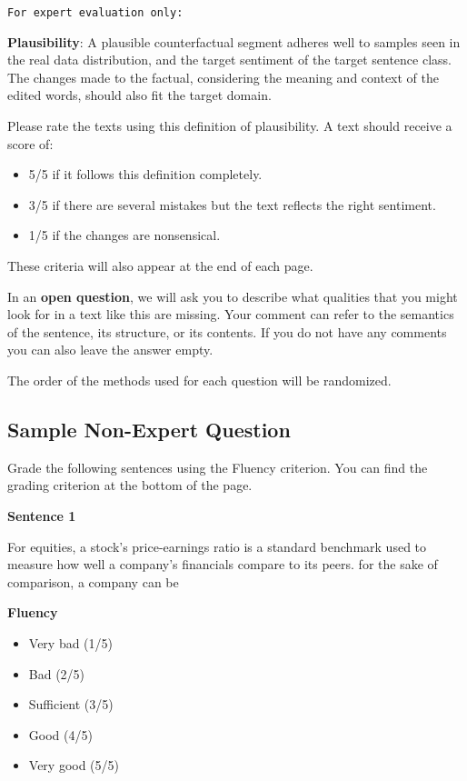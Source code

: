 \documentclass[11pt]{article}
\begin{document}
\verb|For expert evaluation only:|

\textbf{Plausibility}: A plausible counterfactual segment adheres well to samples seen in the real data distribution, and the target sentiment of the target sentence class. The changes made to the factual, considering the meaning and context of the edited words, should also fit the target domain.

Please rate the texts using this definition of plausibility. A text should receive a score of:
\begin{itemize}
    \item 5/5 if it follows this definition completely.
    \item 3/5 if there are several mistakes but the text reflects the right sentiment.
    \item 1/5 if the changes are nonsensical.
\end{itemize}

These criteria will also appear at the end of each page.

In an \textbf{open question}, we will ask you to describe what qualities that you might look for in a text like this are missing. Your comment can refer to the semantics of the sentence, its structure, or its contents. If you do not have any comments you can also leave the answer empty.

The order of the methods used for each question will be randomized.

\subsection{Sample Non-Expert Question}

Grade the following sentences using the Fluency criterion. You can find the grading criterion at the bottom of the page.

\textbf{Sentence 1}

For equities, a stock's price-earnings ratio is a standard benchmark used to measure how well a company's financials compare to its peers. for the sake of comparison, a company can be

\textbf{Fluency}

\begin{itemize}
    \item Very bad (1/5)
    \item Bad (2/5)
    \item Sufficient (3/5)
    \item Good (4/5)
    \item Very good (5/5)
\end{itemize}
\end{document}
